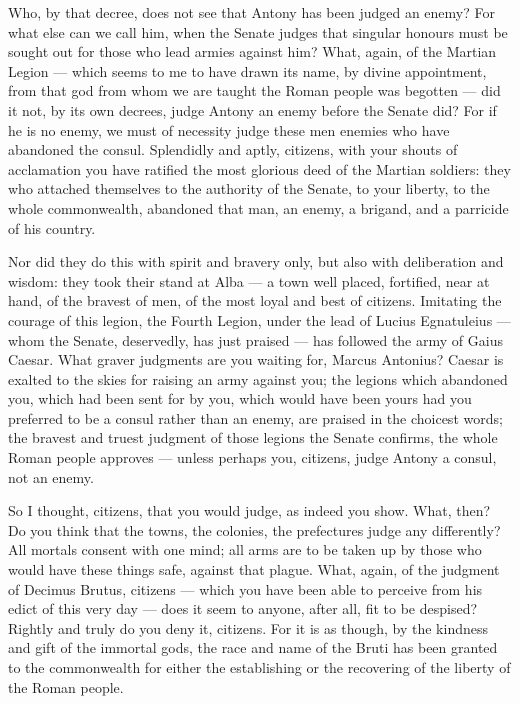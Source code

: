 Who, by that decree, does not see that Antony has been judged an enemy? For what else can we call him, when the Senate judges that singular honours must be sought out for those who lead armies against him? What, again, of the Martian Legion --- which seems to me to have drawn its name, by divine appointment, from that god from whom we are taught the Roman people was begotten --- did it not, by its own decrees, judge Antony an enemy before the Senate did? For if he is no enemy, we must of necessity judge these men enemies who have abandoned the consul. Splendidly and aptly, citizens, with your shouts of acclamation you have ratified the most glorious deed of the Martian soldiers: they who attached themselves to the authority of the Senate, to your liberty, to the whole commonwealth, abandoned that man, an enemy, a brigand, and a parricide of his country.

 Nor did they do this with spirit and bravery only, but also with deliberation and wisdom: they took their stand at Alba --- a town well placed, fortified, near at hand, of the bravest of men, of the most loyal and best of citizens. Imitating the courage of this legion, the Fourth Legion, under the lead of Lucius Egnatuleius --- whom the Senate, deservedly, has just praised --- has followed the army of Gaius Caesar. What graver judgments are you waiting for, Marcus Antonius? Caesar is exalted to the skies for raising an army against you; the legions which abandoned you, which had been sent for by you, which would have been yours had you preferred to be a consul rather than an enemy, are praised in the choicest words; the bravest and truest judgment of those legions the Senate confirms, the whole Roman people approves --- unless perhaps you, citizens, judge Antony a consul, not an enemy.

 So I thought, citizens, that you would judge, as indeed you show. What, then? Do you think that the towns, the colonies, the prefectures judge any differently? All mortals consent with one mind; all arms are to be taken up by those who would have these things safe, against that plague. What, again, of the judgment of Decimus Brutus, citizens --- which you have been able to perceive from his edict of this very day --- does it seem to anyone, after all, fit to be despised? Rightly and truly do you deny it, citizens. For it is as though, by the kindness and gift of the immortal gods, the race and name of the Bruti has been granted to the commonwealth for either the establishing or the recovering of the liberty of the Roman people.


